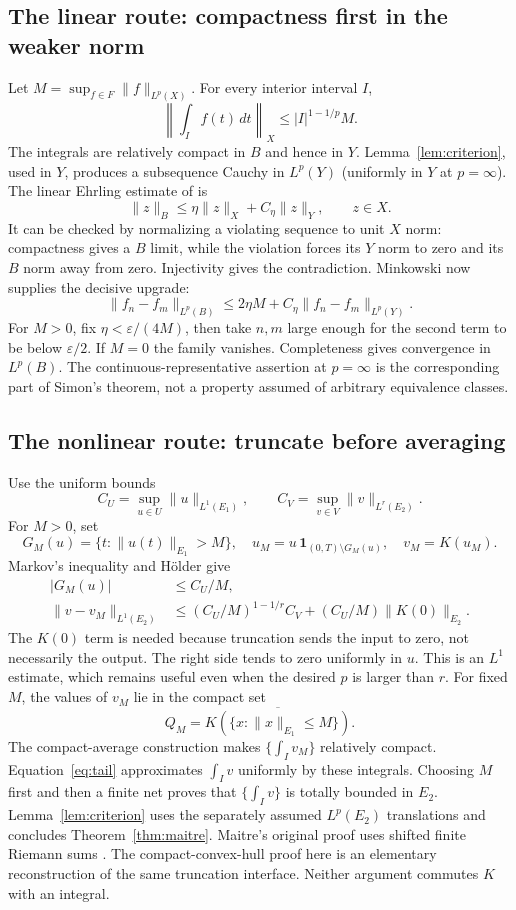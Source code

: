 \documentclass[12pt,reqno]{amsart}
\begin{document}
\subsection{The linear route: compactness first in the weaker norm}
Let $M=\sup_{f\in F}\|f\|_{L^p(X)}$. For every interior interval $I$,
\[
\left\|\int_I f(t)\,dt\right\|_X\le |I|^{1-1/p}M.
\]
The integrals are relatively compact in $B$ and hence in $Y$. Lemma~\ref{lem:criterion}, used in $Y$, produces a subsequence Cauchy in $L^p(Y)$ (uniformly in $Y$ at $p=\infty$).
The linear Ehrling estimate of \cite[Lemma 8, pp.~84--85]{S-simon} is
\[
\|z\|_B\le\eta\|z\|_X+C_\eta\|z\|_Y,\qquad z\in X.
\]
It can be checked by normalizing a violating sequence to unit $X$ norm: compactness gives a $B$ limit, while the violation forces its $Y$ norm to zero and its $B$ norm away from zero. Injectivity gives the contradiction.
Minkowski now supplies the decisive upgrade:
\begin{equation}\label{eq:linearupgrade}
\|f_n-f_m\|_{L^p(B)}\le 2\eta M+C_\eta\|f_n-f_m\|_{L^p(Y)}.
\end{equation}
For $M>0$, fix $\eta<\varepsilon/(4M)$, then take $n,m$ large enough for the second term to be below $\varepsilon/2$. If $M=0$ the family vanishes. Completeness gives convergence in $L^p(B)$. The continuous-representative assertion at $p=\infty$ is the corresponding part of Simon's theorem, not a property assumed of arbitrary equivalence classes.
\subsection{The nonlinear route: truncate before averaging}
Use the uniform bounds
\[
C_U=\sup_{u\in U}\|u\|_{L^1(E_1)},\qquad
C_V=\sup_{v\in V}\|v\|_{L^r(E_2)}.
\]
For $M>0$, set
\[
G_M(u)=\{t:\|u(t)\|_{E_1}>M\},\quad
u_M=u\,\mathbf1_{(0,T)\setminus G_M(u)},\quad v_M=K(u_M).
\]
Markov's inequality and H\"older give
\begin{align}
|G_M(u)|&\le C_U/M,\label{eq:badset}\\
\|v-v_M\|_{L^1(E_2)}
&\le (C_U/M)^{1-1/r}C_V+(C_U/M)\|K(0)\|_{E_2}.
\label{eq:tail}
\end{align}
The $K(0)$ term is needed because truncation sends the input to zero, not necessarily the output. The right side tends to zero uniformly in $u$. This is an $L^1$ estimate, which remains useful even when the desired $p$ is larger than $r$.
For fixed $M$, the values of $v_M$ lie in the compact set
\[
Q_M=\overline{K(\{x:\|x\|_{E_1}\le M\})}.
\]
The compact-average construction makes $\{\int_Iv_M\}$ relatively compact. Equation~\eqref{eq:tail} approximates $\int_Iv$ uniformly by these integrals. Choosing $M$ first and then a finite net proves that $\{\int_Iv\}$ is totally bounded in $E_2$. Lemma~\ref{lem:criterion} uses the separately assumed $L^p(E_2)$ translations and concludes Theorem~\ref{thm:maitre}.
Maitre's original proof uses shifted finite Riemann sums \cite[Lemma 2.3, equations (2.3)--(2.24), pp.~1726--1730]{S-maitre}. The compact-convex-hull proof here is an elementary reconstruction of the same truncation interface. Neither argument commutes $K$ with an integral.
\end{document}
